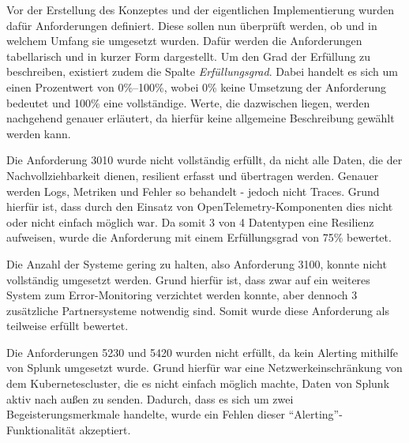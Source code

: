 
Vor der Erstellung des Konzeptes und der eigentlichen Implementierung wurden dafür Anforderungen definiert. Diese sollen nun überprüft werden, ob und in welchem Umfang sie umgesetzt wurden. Dafür werden die Anforderungen tabellarisch und in kurzer Form dargestellt. Um den Grad der Erfüllung zu beschreiben, existiert zudem die Spalte \textit{Erfüllungsgrad}. Dabei handelt es sich um einen Prozentwert von 0\%--100\%, wobei 0\% keine Umsetzung der Anforderung bedeutet und 100\% eine vollständige. Werte, die dazwischen liegen, werden nachgehend genauer erläutert, da hierfür keine allgemeine Beschreibung gewählt werden kann.
	


Die Anforderung 3010 wurde nicht vollständig erfüllt, da nicht alle Daten, die der Nachvollziehbarkeit dienen, resilient erfasst und übertragen werden. Genauer werden Logs, Metriken und Fehler so behandelt - jedoch nicht Traces. Grund hierfür ist, dass durch den Einsatz von OpenTelemetry-Komponenten dies nicht oder nicht einfach möglich war. Da somit 3 von 4 Datentypen eine Resilienz aufweisen, wurde die Anforderung mit einem Erfüllungsgrad von 75\% bewertet.

Die Anzahl der Systeme gering zu halten, also Anforderung 3100, konnte nicht vollständig umgesetzt werden. Grund hierfür ist, dass zwar auf ein weiteres System zum Error-Monitoring verzichtet werden konnte, aber dennoch 3 zusätzliche Partnersysteme notwendig sind. Somit wurde diese Anforderung als teilweise erfüllt bewertet.

Die Anforderungen 5230 und 5420 wurden nicht erfüllt, da kein Alerting mithilfe von Splunk umgesetzt wurde. Grund hierfür war eine Netzwerkeinschränkung von dem Kuber\-netes\-cluster, die es nicht einfach möglich machte, Daten von Splunk aktiv nach außen zu senden. Dadurch, dass es sich um zwei Begeisterungsmerkmale handelte, wurde ein Fehlen dieser \enquote{Alerting}-Funktionalität akzeptiert.